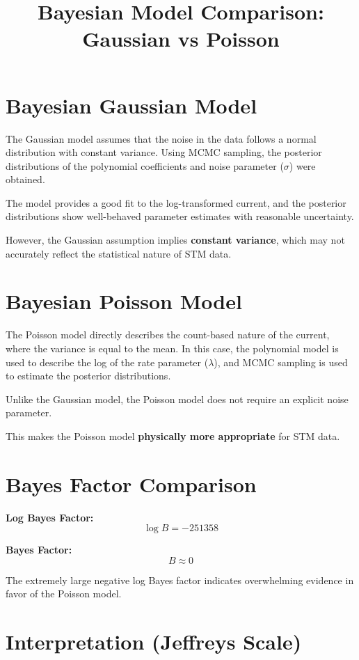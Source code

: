 \documentclass{article}
\title{Bayesian Model Comparison: Gaussian vs Poisson}
\author{}
\date{}
\begin{document}
\maketitle

\section{Bayesian Gaussian Model}

The Gaussian model assumes that the noise in the data follows a normal distribution with constant variance. Using MCMC sampling, the posterior distributions of the polynomial coefficients and noise parameter ($\sigma$) were obtained.

The model provides a good fit to the log-transformed current, and the posterior distributions show well-behaved parameter estimates with reasonable uncertainty.

However, the Gaussian assumption implies \textbf{constant variance}, which may not accurately reflect the statistical nature of STM data.

\section{Bayesian Poisson Model}

The Poisson model directly describes the count-based nature of the current, where the variance is equal to the mean. In this case, the polynomial model is used to describe the log of the rate parameter ($\lambda$), and MCMC sampling is used to estimate the posterior distributions.

Unlike the Gaussian model, the Poisson model does not require an explicit noise parameter.

This makes the Poisson model \textbf{physically more appropriate} for STM data.

\section{Bayes Factor Comparison}

\textbf{Log Bayes Factor:}
\[
\log B = -251358
\]

\textbf{Bayes Factor:}
\[
B \approx 0
\]

The extremely large negative log Bayes factor indicates overwhelming evidence in favor of the Poisson model.

\section{Interpretation (Jeffreys Scale)}
\end{document}
